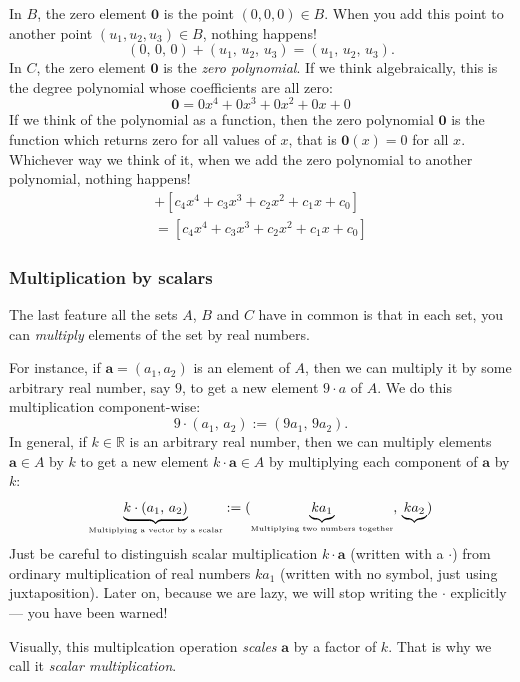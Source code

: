 \documentclass[a4paper,11pt]{book}
\theoremstyle{definition}
\newcommand{\be}{\begin{equation}}
\newcommand{\ee}{\end{equation}}
\newcommand{\ve}[1]{\mathbf{#1}}
\begin{document}
In $B$, the zero element $\ve{0}$ is the point $(0,0,0) \in B$. When you add this point to another point $(u_1, u_2, u_3) \in B$, nothing happens!
\[
 (0, \, 0, \, 0) + (u_1, \, u_2, \, u_3) = (u_1, \, u_2, \, u_3).
\]
In $C$, the zero element $\ve{0}$ is the {\em zero polynomial}. If we think algebraically, this is the degree polynomial whose coefficients are all zero:
\be \label{zero_in_C}
  \ve{0} = 0 x^4 + 0 x^3 + 0 x^2 + 0 x + 0
\ee
If we think of the polynomial as a function, then the zero polynomial $\ve{0}$ is the function which returns zero for all values of $x$, that is $\ve{0} (x) = 0$ for all $x$. Whichever way we think of it, when we add the zero polynomial to another polynomial, nothing happens!
\begin{multline*}
 [0 x^4 + 0 x^3 + 0 x^2 + 0 x + 0 ] + [c_4 x^4 + c_3 x^3 + c_2 x^2 + c_1 x + c_0] \\
 = [c_4 x^4 + c_3 x^3 + c_2 x^2 + c_1 x + c_0]
\end{multline*}

\subsubsection{Multiplication by scalars}
The last feature all the sets $A$, $B$ and $C$ have in common is that in each set, you can {\em multiply} elements of the set by real numbers. 

For instance, if $\ve{a} = (a_1, a_2)$ is an element of $A$, then we can multiply it by some arbitrary real number, say $9$, to get a new element $9\cdot a$ of $A$. We do this multiplication component-wise:
\be \label{sm_in_A}
  9 \cdot (a_1, \,a_2) := (9 a_1, \, 9a_2).
\ee
In general, if $k \in \mathbb{R}$ is an arbitrary real number, then we can multiply elements $\ve{a} \in A$ by $k$ to get a new element $k \cdot \ve{a} \in A$ by multiplying each component of $\ve{a}$ by $k$:
\[
  \underbrace{k \cdot (a_1, \, a_2)}_{\mbox{\tiny Multiplying a vector by a scalar}} := (\underbrace{k a_1}_{\mbox{\tiny Multiplying two numbers together}}, \, \underbrace{k a_2})
\]
Just be careful to distinguish scalar multiplication $k \cdot \ve{a}$ (written with a $\cdot$) from ordinary multiplication of real numbers $k a_1$ (written with no symbol, just using juxtaposition). Later on, because we are lazy, we will stop writing the $\cdot$ explicitly --- you have been warned!


Visually, this multiplcation operation {\em scales} $\ve{a}$ by a factor of $k$. That is why we call it {\em scalar multiplication}. 
\end{document}
